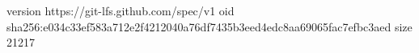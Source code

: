 version https://git-lfs.github.com/spec/v1
oid sha256:e034c33ef583a712e2f4212040a76df7435b3eed4edc8aa69065fac7efbc3aed
size 21217
